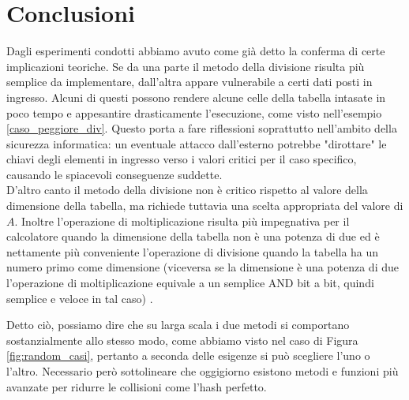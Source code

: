 \newpage
\section{Conclusioni}

Dagli esperimenti condotti abbiamo avuto come già detto la conferma di certe implicazioni teoriche. Se da una parte il metodo della divisione risulta più semplice da implementare, dall'altra appare vulnerabile a certi dati posti in ingresso. Alcuni di questi possono rendere alcune celle della tabella intasate in poco tempo e appesantire drasticamente l'esecuzione, come visto nell'esempio \ref{caso_peggiore_div}. Questo porta a fare riflessioni soprattutto nell'ambito della sicurezza informatica: un eventuale attacco dall'esterno potrebbe "dirottare" le chiavi degli elementi in ingresso verso i valori critici per il caso specifico, causando le spiacevoli conseguenze suddette. 
\\ D'altro canto il metodo della divisione non è critico rispetto al valore della dimensione della tabella, ma richiede tuttavia una scelta appropriata del valore di $A$. Inoltre l'operazione di moltiplicazione risulta più impegnativa per il calcolatore quando la dimensione della tabella non è una potenza di due ed è nettamente più conveniente l'operazione di divisione quando la tabella ha un numero primo come dimensione (viceversa se la dimensione è una potenza di due l'operazione di moltiplicazione equivale a un semplice AND bit a bit, quindi semplice e veloce in tal caso) \cite{Stack}.

Detto ciò, possiamo dire che su larga scala i due metodi si comportano sostanzialmente allo stesso modo, come abbiamo visto nel caso di Figura \ref{fig:random_casi}, pertanto a seconda delle esigenze si può scegliere l'uno o l'altro. Necessario però sottolineare che oggigiorno esistono metodi e funzioni più avanzate per ridurre le collisioni come l'hash perfetto.